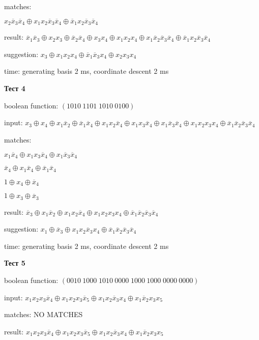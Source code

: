\documentclass[a4paper,12pt,titlepage,finall]{article}
\begin{document}
matches:

$x_2 \overline x_3 \overline x_4 \oplus x_1 x_2 \overline x_3 \overline x_4 \oplus \overline x_1 x_2 \overline x_3 \overline x_4$

result: $\overline x_1 \overline x_3 \oplus x_2 x_3 \oplus \overline x_2 \overline x_4 \oplus x_3 x_4 \oplus x_1 x_2 x_4 \oplus x_1 \overline x_2 \overline x_3 \overline x_4 \oplus \overline x_1 x_2 \overline x_3 \overline x_4$

suggestion: $x_3 \oplus x_1 x_2 x_4 \oplus \overline x_1 \overline x_3 x_4 \oplus x_2 x_3 x_4$

time: generating basis 2 ms, coordinate descent 2 ms

\textbf{Тест 4}

boolean function: $(1010\:1101\;1010\:0100)$

input: $x_3 \oplus x_4 \oplus x_1 \overline x_2 \oplus \overline x_1 \overline x_4 \oplus x_1 x_2 \overline x_4 \oplus x_1 x_3 \overline x_4 \oplus x_1 \overline x_3 \overline x_4 \oplus x_1 x_2 x_3 x_4 \oplus \overline x_1 \overline x_2 \overline x_3 \overline x_4$

matches:

$x_1 \overline x_4 \oplus x_1 x_3 \overline x_4 \oplus x_1 \overline x_3 \overline x_4$

$\overline x_4 \oplus x_1 \overline x_4 \oplus \overline x_1 \overline x_4$

$1 \oplus x_4 \oplus \overline x_4$

$1 \oplus x_3 \oplus \overline x_3$

result: $\overline x_3 \oplus x_1 \overline x_2 \oplus x_1 x_2 \overline x_4 \oplus x_1 x_2 x_3 x_4 \oplus \overline x_1 \overline x_2 \overline x_3 \overline x_4$

suggestion: $x_1 \oplus \overline x_3 \oplus x_1 x_2 \overline x_3 x_4 \oplus \overline x_1 \overline x_2 \overline x_3 \overline x_4$

time: generating basis 2 ms, coordinate descent 2 ms

\textbf{Тест 5}

boolean function: $(0010\:1000\;1010\:0000\;1000\:1000\;0000\:0000)$

input: $x_1 x_2 x_3 \overline x_4 \oplus x_1 x_2 x_3 \overline x_5 \oplus x_1 x_2 \overline x_3 x_4 \oplus x_1 \overline x_2 x_3 x_5$

matches: NO MATCHES

result: $x_1 x_2 x_3 \overline x_4 \oplus x_1 x_2 x_3 \overline x_5 \oplus x_1 x_2 \overline x_3 x_4 \oplus x_1 \overline x_2 x_3 x_5$
\end{document}
